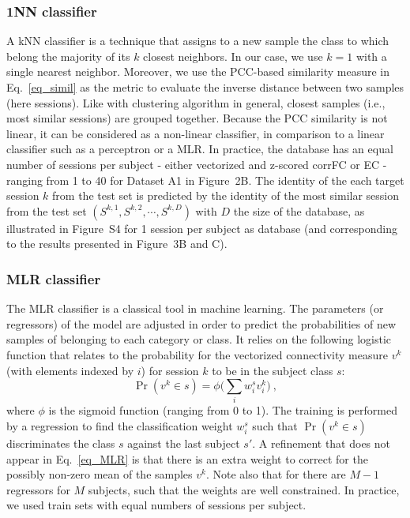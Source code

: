 \documentclass{article}
\begin{document}
\subsubsection{1NN classifier}

A kNN classifier is a technique that assigns to a new sample the class to which belong the majority of its $k$ closest neighbors. 
In our case, we use $k = 1$ with a single nearest neighbor.
Moreover, we use the PCC-based similarity measure in Eq.~\eqref{eq_simil} as the metric to evaluate the inverse distance between two samples (here sessions). Like with clustering algorithm in general, closest samples (i.e., most similar sessions) are grouped together. Because the PCC similarity is not linear, it can be considered as a non-linear classifier, in comparison to a linear classifier such as a perceptron or a MLR.
In practice, the database has an equal number of sessions per subject - either vectorized and z-scored corrFC or EC - ranging from 1 to 40 for Dataset A1 in Figure~2B. The identity of the each target session $k$ from the test set is predicted by the identity of the most similar session from the test set $({S^{k,1}, S^{k,2}, \cdots, S^{k,D}})$ with $D$ the size of the database, as illustrated in Figure~S4 for 1 session per subject as database (and corresponding to the results presented in Figure~3B and C).

\subsubsection{MLR classifier}

The MLR classifier is a classical tool in machine learning. The parameters (or regressors) of the model are adjusted in order to predict the probabilities of new samples of belonging to each category or class. 
It relies on the following logistic function that relates to the probability for the vectorized connectivity measure $v^k$ (with elements indexed by $i$) for session $k$ to be in the subject class $s$:
\begin{equation} \label{eq_MLR}
\Pr(v^k \in s) = \phi\Big( \sum_i w^s_i v^k_i \Big) \ ,
\end{equation}
where $\phi$ is the sigmoid function (ranging from 0 to 1).
The training is performed by a regression to find the classification weight $w^s_i$ such that $\Pr(v^k \in s)$ discriminates the class $s$ against the last subject $s'$. A refinement that does not appear in Eq.~\eqref{eq_MLR} is that there is an extra weight to correct for the possibly non-zero mean of the samples $v^k$. Note also that for there are $M-1$ regressors for $M$ subjects, such that the weights are well constrained.
In practice, we used train sets with equal numbers of sessions per subject.
\end{document}
